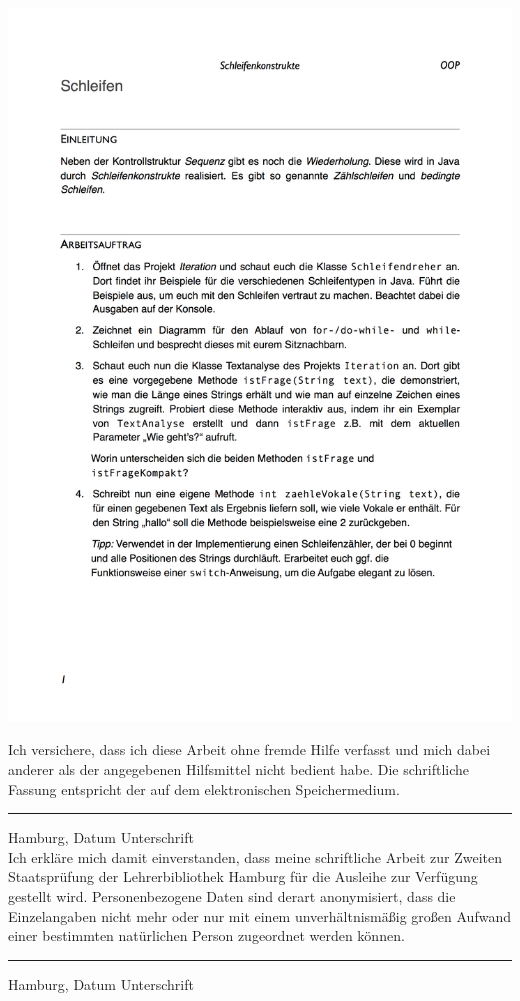 \documentclass[paper=a4, DIV=13, BCOR=12mm, twoside=on, onecolumn=on, open = any, titlepage =on, parskip =half-, headsepline = on, footsepline = on, chapterprefix = on, sectionprefix = on, appendixprefix = off, fontsize = 12pt, numbers = noenddot, abstract = off]{scrreprt}
\begin{document}
\includegraphics[height=\textheight]{images/AB_Schleifenkonstrukte.png}

\cleardoublepage
\newpage
\thispagestyle{empty}
Ich versichere, dass ich diese Arbeit ohne fremde Hilfe verfasst und mich dabei anderer als der angegebenen Hilfsmittel nicht bedient habe. Die schriftliche Fassung entspricht der auf dem elektronischen Speichermedium.

\vspace*{3cm}

\rule{\textwidth}{0.4mm} 
Hamburg, Datum \hspace*{\fill} Unterschrift \hspace*{2cm}\\

\vspace*{3cm}
Ich erkläre mich damit einverstanden, dass meine schriftliche Arbeit zur Zweiten Staatsprüfung der Lehrerbibliothek Hamburg für die Ausleihe zur Verfügung gestellt wird. Personenbezogene Daten sind derart anonymisiert, dass die Einzelangaben nicht mehr oder nur mit einem unverhältnismäßig großen Aufwand einer bestimmten natürlichen Person zugeordnet werden können.
 
\vspace*{3cm}

\rule{\textwidth}{0.4mm} 
Hamburg, Datum \hspace*{\fill} Unterschrift \hspace*{2cm}\\

\end{document}
